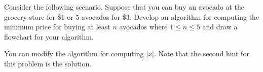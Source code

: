 \documentclass{ximera}
\begin{document}
\begin{question}
	Consider the following scenario. Suppose that you can buy an avocado at the grocery store for \$1 or 5 avocados for \$3. Develop an algorithm for computing the minimum price for buying at least $n$ avocados where $1\leq n\leq 5$ and draw a flowchart for your algorithm.
	\begin{hint}
		You can modify the algorithm for computing $|x|$. Note that the second hint for this problem is the solution.
	\end{hint}
	\begin{hint}
		\begin{center}
		\end{center}
	\end{hint}
\end{question}
\end{document}
